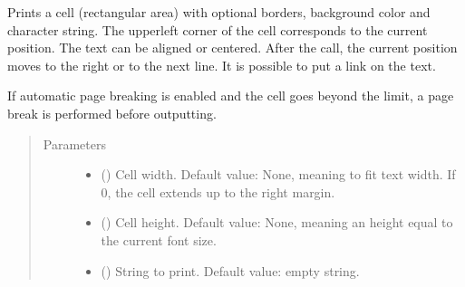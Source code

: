 \documentclass[letterpaper,10pt,english]{sphinxmanual}
\begin{document}
\begin{fulllineitems}
\begin{fulllineitems}
\label{\detokenize{generated/quality_assessment.quality_pdf_report.DefectReportPDF.cell:quality_assessment.quality_pdf_report.DefectReportPDF.cell}}
\sphinxAtStartPar
Prints a cell (rectangular area) with optional borders, background color and
character string. The upper\sphinxhyphen{}left corner of the cell corresponds to the current
position. The text can be aligned or centered. After the call, the current
position moves to the right or to the next line. It is possible to put a link
on the text.

\sphinxAtStartPar
If automatic page breaking is enabled and the cell goes beyond the limit, a
page break is performed before outputting.
\begin{quote}\begin{description}
\item[{Parameters}] \leavevmode\begin{itemize}
\item {} 
\sphinxAtStartPar
{} () \textendash{} Cell width. Default value: None, meaning to fit text width.
If 0, the cell extends up to the right margin.

\item {} 
\sphinxAtStartPar
{} () \textendash{} Cell height. Default value: None, meaning an height equal
to the current font size.

\item {} 
\sphinxAtStartPar
{} () \textendash{} String to print. Default value: empty string.


\end{itemize}
\end{description}
\end{quote}
\end{fulllineitems}
\end{fulllineitems}
\end{document}

